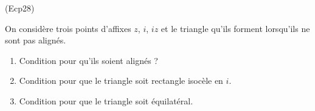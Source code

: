 \begin{tiny}(Ecp28)\end{tiny}
On considère trois points d'affixes $z$, $i$, $iz$ et le triangle qu'ils forment lorsqu'ils ne sont pas alignés.
\begin{enumerate}
  \item Condition pour qu'ils soient alignés ?
  \item Condition pour que le triangle soit rectangle isocèle en $i$.
  \item Condition pour que le triangle soit équilatéral.
\end{enumerate}

 